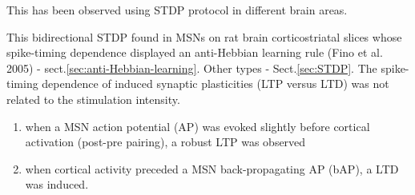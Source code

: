 This has been observed using STDP protocol in different brain areas.

This bidirectional STDP found in MSNs on rat brain corticostriatal slices whose
spike-timing dependence displayed an anti-Hebbian learning rule (Fino et al.
2005) - sect.\ref{sec:anti-Hebbian-learning}. Other types - Sect.\ref{sec:STDP}.
The spike-timing dependence of induced synaptic plasticities (LTP versus LTD)
was not related to the stimulation intensity.

\begin{enumerate}
  \item when a MSN action potential (AP) was evoked slightly
before cortical activation (post-pre pairing), a robust
LTP was observed

  \item when cortical activity preceded a MSN back-propagating AP (bAP), a LTD
  was induced.
\end{enumerate}

